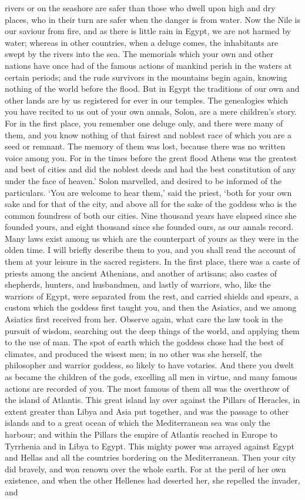 \documentclass[11pt,letter]{article}
\begin{document}
rivers or on the seashore are safer than those who dwell upon high and dry places, who in their turn are safer when the danger is from water. Now the Nile is our saviour from fire, and as there is little rain in Egypt, we are not harmed by water; whereas in other countries, when a deluge comes, the inhabitants are swept by the rivers into the sea. The memorials which your own and other nations have once had of the famous actions of mankind perish in the waters at certain periods; and the rude survivors in the mountains begin again, knowing nothing of the world before the flood. But in Egypt the traditions of our own and other lands are by us registered for ever in our temples. The genealogies which you have recited to us out of your own annals, Solon, are a mere children’s story. For in the first place, you remember one deluge only, and there were many of them, and you know nothing of that fairest and noblest race of which you are a seed or remnant. The memory of them was lost, because there was no written voice among you. For in the times before the great flood Athens was the greatest and best of cities and did the noblest deeds and had the best constitution of any under the face of heaven.’ Solon marvelled, and desired to be informed of the particulars. ‘You are welcome to hear them,’ said the priest, ‘both for your own sake and for that of the city, and above all for the sake of the goddess who is the common foundress of both our cities. Nine thousand years have elapsed since she founded yours, and eight thousand since she founded ours, as our annals record. Many laws exist among us which are the counterpart of yours as they were in the olden time. I will briefly describe them to you, and you shall read the account of them at your leisure in the sacred registers. In the first place, there was a caste of priests among the ancient Athenians, and another of artisans; also castes of shepherds, hunters, and husbandmen, and lastly of warriors, who, like the warriors of Egypt, were separated from the rest, and carried shields and spears, a custom which the goddess first taught you, and then the Asiatics, and we among Asiatics first received from her. Observe again, what care the law took in the pursuit of wisdom, searching out the deep things of the world, and applying them to the use of man. The spot of earth which the goddess chose had the best of climates, and produced the wisest men; in no other was she herself, the philosopher and warrior goddess, so likely to have votaries. And there you dwelt as became the children of the gods, excelling all men in virtue, and many famous actions are recorded of you. The most famous of them all was the overthrow of the island of Atlantis. This great island lay over against the Pillars of Heracles, in extent greater than Libya and Asia put together, and was the passage to other islands and to a great ocean of which the Mediterranean sea was only the harbour; and within the Pillars the empire of Atlantis reached in Europe to Tyrrhenia and in Libya to Egypt. This mighty power was arrayed against Egypt and Hellas and all the countries bordering on the Mediterranean. Then your city did bravely, and won renown over the whole earth. For at the peril of her own existence, and when the other Hellenes had deserted her, she repelled the invader, and 
\end{document}
